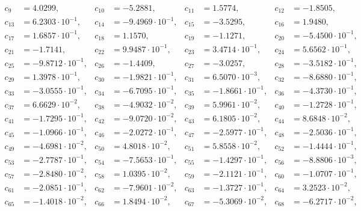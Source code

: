 \begin{align*}
c_{ 9 } &= 4.0299, & c_{ 10 } &= -5.2881, & c_{ 11 } &= 1.5774, & c_{ 12 } &= -1.8505,\\ 
c_{ 13 } &= 6.2303 \cdot 10^{ -1 }, & c_{ 14 } &= -9.4969 \cdot 10^{ -1 }, & c_{ 15 } &= -3.5295, & c_{ 16 } &= 1.9480,\\ 
c_{ 17 } &= 1.6857 \cdot 10^{ -1 }, & c_{ 18 } &= 1.1570, & c_{ 19 } &= -1.1271, & c_{ 20 } &= -5.4500 \cdot 10^{ -1 },\\ 
c_{ 21 } &= -1.7141, & c_{ 22 } &= 9.9487 \cdot 10^{ -1 }, & c_{ 23 } &= 3.4714 \cdot 10^{ -1 }, & c_{ 24 } &= 5.6562 \cdot 10^{ -1 },\\ 
c_{ 25 } &= -9.8712 \cdot 10^{ -1 }, & c_{ 26 } &= -1.4409, & c_{ 27 } &= -3.0257, & c_{ 28 } &= -3.5182 \cdot 10^{ -1 },\\ 
c_{ 29 } &= 1.3978 \cdot 10^{ -1 }, & c_{ 30 } &= -1.9821 \cdot 10^{ -1 }, & c_{ 31 } &= 6.5070 \cdot 10^{ -3 }, & c_{ 32 } &= -8.6880 \cdot 10^{ -1 },\\ 
c_{ 33 } &= -3.0555 \cdot 10^{ -1 }, & c_{ 34 } &= -6.7095 \cdot 10^{ -1 }, & c_{ 35 } &= -1.8661 \cdot 10^{ -1 }, & c_{ 36 } &= -4.3730 \cdot 10^{ -1 },\\ 
c_{ 37 } &= 6.6629 \cdot 10^{ -2 }, & c_{ 38 } &= -4.9032 \cdot 10^{ -2 }, & c_{ 39 } &= 5.9961 \cdot 10^{ -2 }, & c_{ 40 } &= -1.2728 \cdot 10^{ -1 },\\ 
c_{ 41 } &= -1.7295 \cdot 10^{ -1 }, & c_{ 42 } &= -9.0720 \cdot 10^{ -2 }, & c_{ 43 } &= 6.1805 \cdot 10^{ -2 }, & c_{ 44 } &= 8.6848 \cdot 10^{ -2 },\\ 
c_{ 45 } &= -1.0966 \cdot 10^{ -1 }, & c_{ 46 } &= -2.0272 \cdot 10^{ -1 }, & c_{ 47 } &= -2.5977 \cdot 10^{ -1 }, & c_{ 48 } &= -2.5036 \cdot 10^{ -1 },\\ 
c_{ 49 } &= -4.6981 \cdot 10^{ -2 }, & c_{ 50 } &= 4.8018 \cdot 10^{ -2 }, & c_{ 51 } &= 5.8558 \cdot 10^{ -2 }, & c_{ 52 } &= -1.4444 \cdot 10^{ -1 },\\ 
c_{ 53 } &= -2.7787 \cdot 10^{ -1 }, & c_{ 54 } &= -7.5653 \cdot 10^{ -1 }, & c_{ 55 } &= -1.4297 \cdot 10^{ -1 }, & c_{ 56 } &= -8.8806 \cdot 10^{ -3 },\\ 
c_{ 57 } &= -2.8480 \cdot 10^{ -2 }, & c_{ 58 } &= 1.0395 \cdot 10^{ -2 }, & c_{ 59 } &= -2.1121 \cdot 10^{ -1 }, & c_{ 60 } &= -1.0707 \cdot 10^{ -1 },\\ 
c_{ 61 } &= -2.0851 \cdot 10^{ -1 }, & c_{ 62 } &= -7.9601 \cdot 10^{ -2 }, & c_{ 63 } &= -1.3727 \cdot 10^{ -1 }, & c_{ 64 } &= 3.2523 \cdot 10^{ -2 },\\ 
c_{ 65 } &= -1.4018 \cdot 10^{ -2 }, & c_{ 66 } &= 1.8494 \cdot 10^{ -2 }, & c_{ 67 } &= -5.3069 \cdot 10^{ -2 }, & c_{ 68 } &= -6.2717 \cdot 10^{ -2 },\\ 

\end{align*}
